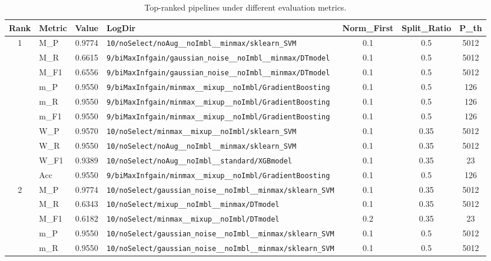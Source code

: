 \begin{table}[htbp]
\caption{Top-ranked pipelines under different evaluation metrics.}
\label{tab:rank_metric_vertical}
\centering
\small
\setlength{\tabcolsep}{4pt}
\begin{tabular}{|c|l|c|>{\ttfamily\footnotesize}p{7.2cm}|c|c|c|}
\hline
Rank & Metric & Value & LogDir & Norm\_First & Split\_Ratio & P\_th \\
\hline
\multirow{10}{*}{1} & M\_P & 0.9774 & \texttt{10/noSelect/noAug\_\_noImbl\_\_minmax/sklearn\_SVM} & 0.1 & 0.5  & 5012 \\ 
 & M\_R & 0.6615 & \texttt{9/biMaxInfgain/gaussian\_noise\_\_noImbl\_\_minmax/DTmodel} & 0.1 & 0.5  & 5012 \\ 
 & M\_F1 & 0.6556 & \texttt{9/biMaxInfgain/gaussian\_noise\_\_noImbl\_\_minmax/DTmodel} & 0.1 & 0.5  & 5012 \\ 
 & m\_P & 0.9550 & \texttt{9/biMaxInfgain/minmax\_\_mixup\_\_noImbl/GradientBoosting} & 0.1 & 0.5  & 126 \\ 
 & m\_R & 0.9550 & \texttt{9/biMaxInfgain/minmax\_\_mixup\_\_noImbl/GradientBoosting} & 0.1 & 0.5  & 126 \\ 
 & m\_F1 & 0.9550 & \texttt{9/biMaxInfgain/minmax\_\_mixup\_\_noImbl/GradientBoosting} & 0.1 & 0.5  & 126 \\ 
 & W\_P & 0.9570 & \texttt{10/noSelect/minmax\_\_mixup\_\_noImbl/sklearn\_SVM} & 0.1 & 0.35  & 5012 \\ 
 & W\_R & 0.9550 & \texttt{10/noSelect/noAug\_\_noImbl\_\_minmax/sklearn\_SVM} & 0.1 & 0.35  & 5012 \\ 
 & W\_F1 & 0.9389 & \texttt{10/noSelect/noAug\_\_noImbl\_\_standard/XGBmodel} & 0.1 & 0.35  & 23 \\ 
 & Acc & 0.9550 & \texttt{9/biMaxInfgain/minmax\_\_mixup\_\_noImbl/GradientBoosting} & 0.1 & 0.5  & 126 \\ 
\hline
\multirow{10}{*}{2} & M\_P & 0.9774 & \texttt{10/noSelect/gaussian\_noise\_\_noImbl\_\_minmax/sklearn\_SVM} & 0.1 & 0.35  & 5012 \\ 
 & M\_R & 0.6343 & \texttt{10/noSelect/mixup\_\_noImbl\_\_minmax/DTmodel} & 0.1 & 0.35  & 5012 \\ 
 & M\_F1 & 0.6182 & \texttt{10/noSelect/minmax\_\_mixup\_\_noImbl/DTmodel} & 0.2 & 0.35  & 23 \\ 
 & m\_P & 0.9550 & \texttt{10/noSelect/gaussian\_noise\_\_noImbl\_\_minmax/sklearn\_SVM} & 0.1 & 0.5  & 5012 \\ 
 & m\_R & 0.9550 & \texttt{10/noSelect/gaussian\_noise\_\_noImbl\_\_minmax/sklearn\_SVM} & 0.1 & 0.5  & 5012 \\ 

\end{tabular}
\end{table}
